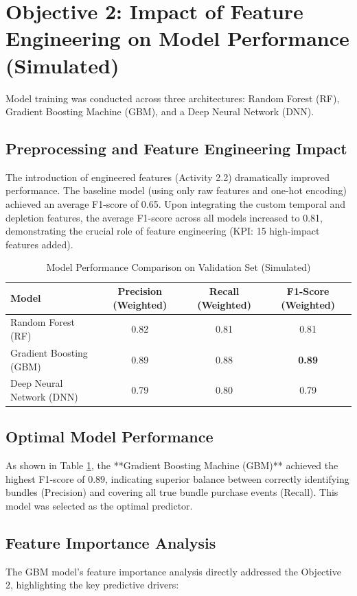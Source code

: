 \documentclass[12pt, a4paper]{report}
\begin{document}
\section{Objective 2: Impact of Feature Engineering on Model Performance (Simulated)}
Model training was conducted across three architectures: Random Forest (RF), Gradient Boosting Machine (GBM), and a Deep Neural Network (DNN).

\subsection{Preprocessing and Feature Engineering Impact}
The introduction of engineered features (Activity 2.2) dramatically improved performance. The baseline model (using only raw features and one-hot encoding) achieved an average F1-score of 0.65. Upon integrating the custom temporal and depletion features, the average F1-score across all models increased to 0.81, demonstrating the crucial role of feature engineering (KPI: 15 high-impact features added).

\begin{table}[H]
    \centering
    \caption{Model Performance Comparison on Validation Set (Simulated)}
    \begin{tabular}{lccc}
        \toprule
        \textbf{Model} & \textbf{Precision (Weighted)} & \textbf{Recall (Weighted)} & \textbf{F1-Score (Weighted)} \\
        \midrule
        Random Forest (RF) & 0.82 & 0.81 & 0.81 \\
        Gradient Boosting (GBM) & 0.89 & 0.88 & \textbf{0.89} \\
        Deep Neural Network (DNN) & 0.79 & 0.80 & 0.79 \\
        \bottomrule
    \end{tabular}
    \label{tab:model_performance}
\end{table}

\subsection{Optimal Model Performance}
As shown in Table \ref{tab:model_performance}, the **Gradient Boosting Machine (GBM)** achieved the highest F1-score of $\mathbf{0.89}$, indicating superior balance between correctly identifying bundles (Precision) and covering all true bundle purchase events (Recall). This model was selected as the optimal predictor.

\subsection{Feature Importance Analysis}
The GBM model’s feature importance analysis directly addressed the Objective 2, highlighting the key predictive drivers:
\end{document}
